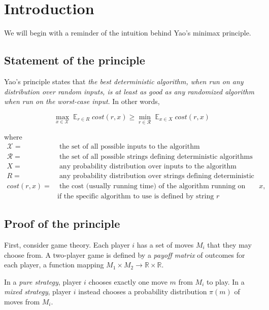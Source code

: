 \section{Introduction}

We will begin with a reminder of the intuition behind Yao's minimax principle.

\subsection{Statement of the principle}

Yao's principle states that \emph{the best deterministic algorithm, when run on any distribution over random inputs, is at least as good as any randomized algorithm when run on the worst-case input}. In other words,

$$\max_{x \in \mathcal{X}} \mathop{\mathds{E}}_{r \in R} cost(r, x) \geq \min_{r \in \mathcal{R}} \mathop{\mathds{E}}_{x \in X} cost(r, x)$$

where \begin{align*}
\mathcal{X} =&\; \text{the set of all possible inputs to the algorithm}
\\
\mathcal{R} =&\; \text{the set of all possible strings defining deterministic algorithms}
\\
X =&\; \text{any probability distribution over inputs to the algorithm}
\\
R =&\; \text{any probability distribution over strings defining deterministic algorithms}
\\
cost(r, x) =&\; \text{the cost (usually running time) of the algorithm running on input $x$,}
          \\& \text{if the specific algorithm to use is defined by string $r$}
\end{align*}

\subsection{Proof of the principle}

First, consider game theory. Each player $i$ has a set of moves $M_i$ that they may choose from. A two-player game is defined by a \emph{payoff matrix} of outcomes for each player, a function mapping $M_1 \times M_2 \rightarrow \mathds{R} \times \mathds{R}$.

In a \emph{pure strategy}, player $i$ chooses exactly one move $m$ from $M_i$ to play. In a \emph{mixed strategy}, player $i$ instead chooses a probability distribution $\pi(m)$ of moves from $M_i$.

